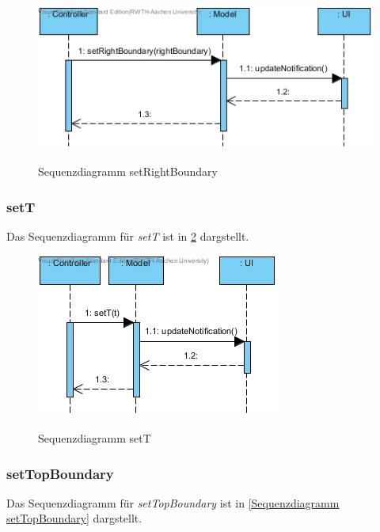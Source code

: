 \begin{figure}[H]
	\centering
	\includegraphics[scale=.6]{Bilder/Model__setRightBoundary().jpg}\\
	\caption{Sequenzdiagramm setRightBoundary}
	\label{Sequenzdiagramm setRightBoundary}
\end{figure}

\subsubsection*{setT}

Das Sequenzdiagramm für \emph{setT} ist in \ref{Sequenzdiagramm setT} dargstellt.

\begin{figure}[H]
	\centering
	\includegraphics[scale=.6]{Bilder/Model__setT().jpg}\\
	\caption{Sequenzdiagramm setT}
	\label{Sequenzdiagramm setT}
\end{figure}

\subsubsection*{setTopBoundary}

Das Sequenzdiagramm für \emph{setTopBoundary} ist in \ref{Sequenzdiagramm setTopBoundary} dargstellt.

